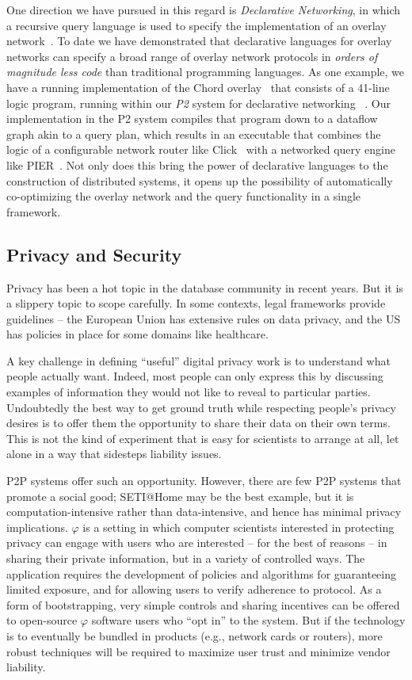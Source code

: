 \documentclass{acm_proc_article-sp}
\def\philogo{{\large $\varphi$}\xspace}
\begin{document}
One direction we have pursued in this regard is {\em Declarative Networking}, in which a recursive query language is used to specify the implementation of an overlay network~\cite{loo-sosp05,loo-sigcomm05,loo-sigmod06}. To date we have demonstrated that declarative languages for overlay networks can specify a broad range of overlay network protocols in {\em orders of magnitude less code} than traditional programming languages. As one example, we have a running implementation of the Chord overlay~\cite{Stoica2003} that consists of a 41-line logic program, running within our \emph{P2} system for declarative networking~\cite{loo-sosp05} . Our implementation in the P2 system compiles that program down to a dataflow graph akin to a query plan, which results in an executable that combines the logic of a configurable network router like Click~\cite{click-tocs} with a networked query engine like PIER~\cite{pier-cidr}. Not only does this bring the power of declarative languages to the construction of distributed systems, it opens up the possibility of automatically co-optimizing the overlay network and the query functionality in a single framework.

\subsection{Privacy and Security} Privacy has been a hot topic in the database community in recent years. But it is a slippery topic to scope carefully. In some contexts, legal frameworks provide guidelines -- the European Union has extensive rules on data privacy, and the US has policies in place for some domains like healthcare.

A key challenge in defining ``useful'' digital privacy work is to understand what people actually want. Indeed, most people can only express this by discussing examples of information they would not like to reveal to particular parties. Undoubtedly the best way to get ground truth while respecting people's privacy desires is to offer them the opportunity to share their data on their own terms. This is not the kind of experiment that is easy for scientists to arrange at all, let alone in a way that sidesteps liability issues.

P2P systems offer such an opportunity. However, there are few P2P systems that promote a social good; SETI@Home may be the best example, but it is computation-intensive rather than data-intensive, and hence has minimal privacy implications. \philogo is a setting in which computer scientists interested in protecting privacy can engage with users who are interested -- for the best of reasons -- in sharing their private information, but in a variety of controlled ways. The application requires the development of policies and algorithms for guaranteeing limited exposure, and for allowing users to verify adherence to protocol. As a form of bootstrapping, very simple controls and sharing incentives can be offered to open-source \philogo software users who ``opt in'' to the system. But if the technology is to eventually be bundled in products (e.g., network cards or routers), more robust techniques will be required to maximize user trust and minimize vendor liability.
\end{document}
